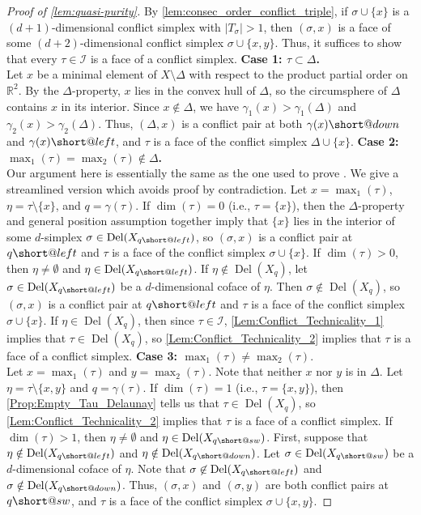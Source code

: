 \documentclass[11pt]{amsart}
\makeatletter
\newcommand{\R}{\mathbb{R}} %
\DeclareMathOperator{\DelT}{Del}
\newcommand{\Incr}[0]{\mathcal{I}}
\DeclareRobustCommand{\subleft}{%
  \mathrel{\mathpalette\short@left\relax}%
}
\newcommand{\short@left}[2]{%
  \mkern2mu
  \clipbox{0 0 {.35\width} 0}{$\m@th#1\vphantom{+}{\leftarrow}$}%
  }
\DeclareRobustCommand{\subdown}{%
  \mathrel{\mathpalette\short@down\relax}%
}
\newcommand{\short@down}[2]{%
  \mkern2mu
  \clipbox{0 0 0 {.45\height}}{$\m@th#1\vphantom{+}{\downarrow}$}%
}
\DeclareRobustCommand{\subdownleft}{%
  \mathrel{\mathpalette\short@sw\relax}%
}
\newcommand{\short@sw}[2]{%
  \mkern2mu
  \clipbox{0 0 {.55\width} {.55\height}}{$\m@th#1\vphantom{+}{\swarrow}$}%
}
\theoremstyle{plain}
\theoremstyle{definition}
\theoremstyle{remark}
\makeatother
\begin{document}
\begin{proof}[Proof of \cref{lem:quasi-purity}]
By \cref{lem:consec_order_conflict_triple}, if $\sigma \cup \{x\}$ is a $(d+1)$-dimensional conflict simplex with $|T_{\sigma}|>1$, then $(\sigma, x)$ is a face of some $(d+2)$-dimensional conflict simplex $\sigma \cup \{x, y\}$.  Thus, it suffices to show that every $\tau \in \Incr$ is a face of a conflict simplex.
%
%
%
\medskip\noindent\textbf{Case 1: $\tau\subset \Delta$.}\\
Let $x$ be a minimal element of $X\setminus \Delta$ with respect to the product partial order on $\R^2$.  By the $\Delta$-property, $x$ lies in the convex hull of $\Delta$, so the circumsphere
of $\Delta$ contains $x$ in its interior. Since $x \notin \Delta$, we
have $\gamma_1(x) > \gamma_1(\Delta)$ and $\gamma_2(x) > \gamma_2(\Delta)$.  Thus, 
$(\Delta, x)$ is a conflict pair at both $\gamma(x){\subdown}$ and $\gamma(x){\subleft}$, and $\tau$ is a face of the conflict simplex $\Delta\cup\{x\}$.
%
\medskip\noindent\textbf{Case 2:  $\max_1(\tau)=\max_2(\tau)\notin \Delta$.}\\
Our argument here is essentially the same as the one used to prove \cite[Lemma 2.3]{alonsoDelaunayBifiltrationsFunctions2024}.  We give a streamlined version which avoids proof by contradiction.  
%
Let $x=\max_1(\tau)$, $\eta=\tau\setminus\{x\}$, and $q=\gamma(\tau)$.  If $\dim(\tau)=0$ (i.e., $\tau=\{x\}$), then the $\Delta$-property and general position assumption together imply that  $\{x\}$ lies in the interior of some $d$-simplex $\sigma\in \DelT(X_{q{\subleft}})$, so $(\sigma,x)$ is a conflict pair at $q{\subleft}$ and $\tau$ is a face of the conflict simplex $\sigma\cup\{x\}$.  If $\dim(\tau)>0$, then $\eta\ne\emptyset$ and $\eta\in \DelT(X_{q{\subleft}})$.  If $\eta\notin \DelT(X_{q})$, let $\sigma\in \DelT(X_{q{\subleft}})$ be a $d$-dimensional coface of $\eta$.  Then $\sigma\notin \DelT(X_{q})$, so $(\sigma, x)$ is a conflict pair at $q{\subleft}$ and $\tau$ is a face of the conflict simplex $\sigma\cup\{x\}$.  If $\eta\in \DelT(X_{q})$, then since $\tau\in \Incr$, \cref{Lem:Conflict_Technicality_1} implies that $\tau\in \DelT(X_{q})$, so \cref{Lem:Conflict_Technicality_2} implies that $\tau$ is a face of a conflict simplex.  
%
\medskip\noindent\textbf{Case 3:  $\max_1(\tau)\ne\max_2(\tau)$}.\\
Let $x=\max_1(\tau)$ and $y=\max_2(\tau)$.  Note that neither $x$ nor $y$ is in $\Delta$.  Let $\eta=\tau\setminus\{x,y\}$ and $q=\gamma(\tau)$.  If $\dim(\tau)=1$ (i.e., $\tau=\{x,y\}$), then \cref{Prop:Empty_Tau_Delaunay} tells us that $\tau\in \DelT(X_q)$, so \cref{Lem:Conflict_Technicality_2} implies that $\tau$ is a face of a conflict simplex.  If $\dim(\tau)>1$, then $\eta\ne\emptyset$ and $\eta\in \DelT(X_{q{\subdownleft}})$.  First, suppose that $\eta\notin \DelT(X_{q{\subleft}})$ and $\eta\notin \DelT(X_{q{\subdown}})$.  Let $\sigma\in \DelT(X_{q{\subdownleft}})$ be a $d$-dimensional coface of $\eta$.    Note that $\sigma\not\in \DelT(X_{q{\subleft}})$ and $\sigma\notin \DelT(X_{q{\subdown}})$.  Thus, $(\sigma, x)$ and $(\sigma, y)$ are both conflict pairs at $q{\subdownleft}$, and $\tau$ is a face of the conflict simplex $\sigma\cup\{x,y\}$.  

\end{proof}
\end{document}
